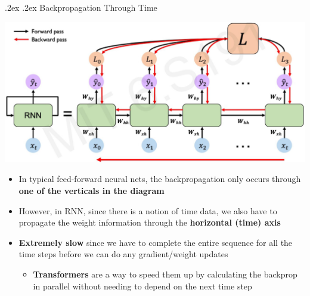 \documentclass[landscape,a4paper]{article}
\makeatletter
\renewcommand{\subsection}{\@startsection{subsection}{1}{0mm}%
	{.2ex}%
	{.2ex}%
	{\sffamily\bfseries}}
\makeatother
\begin{document}
\begin{multicols*}{4}
	\subsection{Backpropagation Through Time}
	\begin{center}
		\includegraphics[width=0.7\columnwidth]{backprop-through-time}
	\end{center}
	\begin{itemize}
		\item In typical feed-forward neural nets, the backpropagation only occurs through \textbf{one of the verticals in the diagram}
		\item However, in RNN, since there is a notion of time data, we also have to propagate the weight information through the \textbf{horizontal (time) axis}
		\item \textbf{Extremely slow} since we have to complete the entire sequence for all the time steps before we can do any gradient/weight updates
		\begin{itemize}
			\item \textbf{Transformers} are a way to speed them up by calculating the backprop in parallel without needing to depend on the next time step
		\end{itemize}
	\end{itemize}

\end{multicols*}
\end{document}
